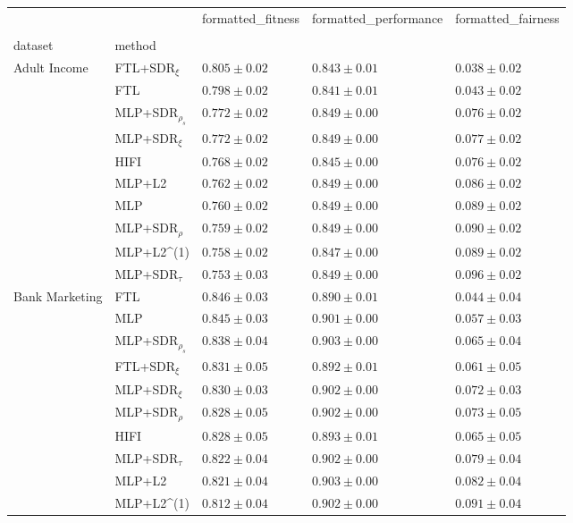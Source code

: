 \begin{tabular}{lllll}
\toprule
 &  & formatted_fitness & formatted_performance & formatted_fairness \\
 &  &  &  &  \\
dataset & method &  &  &  \\
\midrule
\multirow[t]{10}{*}{Adult Income} & FTL+SDR$_{\xi}$ & $0.805 \pm0.02$ & $0.843 \pm0.01$ & $0.038 \pm0.02$ \\
 & FTL & $0.798 \pm0.02$ & $0.841 \pm0.01$ & $0.043 \pm0.02$ \\
 & MLP+SDR$_{\rho_s}$ & $0.772 \pm0.02$ & $0.849 \pm0.00$ & $0.076 \pm0.02$ \\
 & MLP+SDR$_{\xi}$ & $0.772 \pm0.02$ & $0.849 \pm0.00$ & $0.077 \pm0.02$ \\
 & HIFI & $0.768 \pm0.02$ & $0.845 \pm0.00$ & $0.076 \pm0.02$ \\
 & MLP+L2 & $0.762 \pm0.02$ & $0.849 \pm0.00$ & $0.086 \pm0.02$ \\
 & MLP & $0.760 \pm0.02$ & $0.849 \pm0.00$ & $0.089 \pm0.02$ \\
 & MLP+SDR$_{\rho}$ & $0.759 \pm0.02$ & $0.849 \pm0.00$ & $0.090 \pm0.02$ \\
 & MLP+L2^{(1)} & $0.758 \pm0.02$ & $0.847 \pm0.00$ & $0.089 \pm0.02$ \\
 & MLP+SDR$_{\tau}$ & $0.753 \pm0.03$ & $0.849 \pm0.00$ & $0.096 \pm0.02$ \\
\cline{1-5}
\multirow[t]{10}{*}{Bank Marketing} & FTL & $0.846 \pm0.03$ & $0.890 \pm0.01$ & $0.044 \pm0.04$ \\
 & MLP & $0.845 \pm0.03$ & $0.901 \pm0.00$ & $0.057 \pm0.03$ \\
 & MLP+SDR$_{\rho_s}$ & $0.838 \pm0.04$ & $0.903 \pm0.00$ & $0.065 \pm0.04$ \\
 & FTL+SDR$_{\xi}$ & $0.831 \pm0.05$ & $0.892 \pm0.01$ & $0.061 \pm0.05$ \\
 & MLP+SDR$_{\xi}$ & $0.830 \pm0.03$ & $0.902 \pm0.00$ & $0.072 \pm0.03$ \\
 & MLP+SDR$_{\rho}$ & $0.828 \pm0.05$ & $0.902 \pm0.00$ & $0.073 \pm0.05$ \\
 & HIFI & $0.828 \pm0.05$ & $0.893 \pm0.01$ & $0.065 \pm0.05$ \\
 & MLP+SDR$_{\tau}$ & $0.822 \pm0.04$ & $0.902 \pm0.00$ & $0.079 \pm0.04$ \\
 & MLP+L2 & $0.821 \pm0.04$ & $0.903 \pm0.00$ & $0.082 \pm0.04$ \\
 & MLP+L2^{(1)} & $0.812 \pm0.04$ & $0.902 \pm0.00$ & $0.091 \pm0.04$ \\

\end{tabular}

